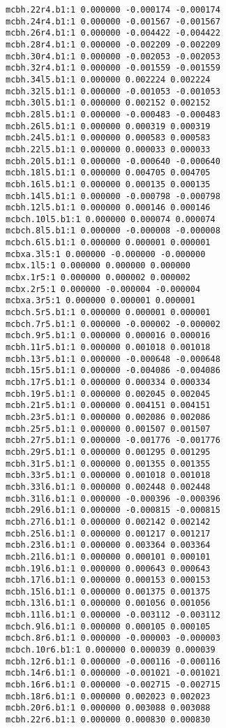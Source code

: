 \begin{verbatim}
mcbh.22r4.b1:1 0.000000 -0.000174 -0.000174
mcbh.24r4.b1:1 0.000000 -0.001567 -0.001567
mcbh.26r4.b1:1 0.000000 -0.004422 -0.004422
mcbh.28r4.b1:1 0.000000 -0.002209 -0.002209
mcbh.30r4.b1:1 0.000000 -0.002053 -0.002053
mcbh.32r4.b1:1 0.000000 -0.001559 -0.001559
mcbh.34l5.b1:1 0.000000 0.002224 0.002224
mcbh.32l5.b1:1 0.000000 -0.001053 -0.001053
mcbh.30l5.b1:1 0.000000 0.002152 0.002152
mcbh.28l5.b1:1 0.000000 -0.000483 -0.000483
mcbh.26l5.b1:1 0.000000 0.000319 0.000319
mcbh.24l5.b1:1 0.000000 0.000583 0.000583
mcbh.22l5.b1:1 0.000000 0.000033 0.000033
mcbh.20l5.b1:1 0.000000 -0.000640 -0.000640
mcbh.18l5.b1:1 0.000000 0.004705 0.004705
mcbh.16l5.b1:1 0.000000 0.000135 0.000135
mcbh.14l5.b1:1 0.000000 -0.000798 -0.000798
mcbh.12l5.b1:1 0.000000 0.000146 0.000146
mcbch.10l5.b1:1 0.000000 0.000074 0.000074
mcbch.8l5.b1:1 0.000000 -0.000008 -0.000008
mcbch.6l5.b1:1 0.000000 0.000001 0.000001
mcbxa.3l5:1 0.000000 -0.000000 -0.000000
mcbx.1l5:1 0.000000 0.000000 0.000000
mcbx.1r5:1 0.000000 0.000002 0.000002
mcbx.2r5:1 0.000000 -0.000004 -0.000004
mcbxa.3r5:1 0.000000 0.000001 0.000001
mcbch.5r5.b1:1 0.000000 0.000001 0.000001
mcbch.7r5.b1:1 0.000000 -0.000002 -0.000002
mcbch.9r5.b1:1 0.000000 0.000016 0.000016
mcbh.11r5.b1:1 0.000000 0.001018 0.001018
mcbh.13r5.b1:1 0.000000 -0.000648 -0.000648
mcbh.15r5.b1:1 0.000000 -0.004086 -0.004086
mcbh.17r5.b1:1 0.000000 0.000334 0.000334
mcbh.19r5.b1:1 0.000000 0.002045 0.002045
mcbh.21r5.b1:1 0.000000 0.004151 0.004151
mcbh.23r5.b1:1 0.000000 0.002086 0.002086
mcbh.25r5.b1:1 0.000000 0.001507 0.001507
mcbh.27r5.b1:1 0.000000 -0.001776 -0.001776
mcbh.29r5.b1:1 0.000000 0.001295 0.001295
mcbh.31r5.b1:1 0.000000 0.001355 0.001355
mcbh.33r5.b1:1 0.000000 0.001018 0.001018
mcbh.33l6.b1:1 0.000000 0.002448 0.002448
mcbh.31l6.b1:1 0.000000 -0.000396 -0.000396
mcbh.29l6.b1:1 0.000000 -0.000815 -0.000815
mcbh.27l6.b1:1 0.000000 0.002142 0.002142
mcbh.25l6.b1:1 0.000000 0.001217 0.001217
mcbh.23l6.b1:1 0.000000 0.003364 0.003364
mcbh.21l6.b1:1 0.000000 0.000101 0.000101
mcbh.19l6.b1:1 0.000000 0.000643 0.000643
mcbh.17l6.b1:1 0.000000 0.000153 0.000153
mcbh.15l6.b1:1 0.000000 0.001375 0.001375
mcbh.13l6.b1:1 0.000000 0.001056 0.001056
mcbh.11l6.b1:1 0.000000 -0.003112 -0.003112
mcbch.9l6.b1:1 0.000000 0.000105 0.000105
mcbch.8r6.b1:1 0.000000 -0.000003 -0.000003
mcbch.10r6.b1:1 0.000000 0.000039 0.000039
mcbh.12r6.b1:1 0.000000 -0.000116 -0.000116
mcbh.14r6.b1:1 0.000000 -0.001021 -0.001021
mcbh.16r6.b1:1 0.000000 -0.002715 -0.002715
mcbh.18r6.b1:1 0.000000 0.002023 0.002023
mcbh.20r6.b1:1 0.000000 0.003088 0.003088
mcbh.22r6.b1:1 0.000000 0.000830 0.000830

\end{verbatim}
